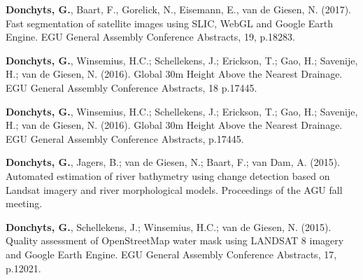 \begin{etaremune}{\small

\item \textbf{Donchyts, G.}, Baart, F., Gorelick, N., Eisemann, E., van de Giesen, N. (2017). Fast segmentation of satellite images using SLIC, WebGL and Google Earth Engine. EGU General Assembly Conference Abstracts, 19, p.18283.

\item \textbf{Donchyts, G.},  Winsemius, H.C.; Schellekens, J.; Erickson, T.; Gao, H.; Savenije, H.; van de Giesen, N. (2016). Global 30m Height Above the Nearest Drainage. EGU General Assembly Conference Abstracts, 18 p.17445.

\item \textbf{Donchyts, G.},  Winsemius, H.C.; Schellekens, J.; Erickson, T.; Gao, H.; Savenije, H.; van de Giesen, N. (2016). Global 30m Height Above the Nearest Drainage. EGU General Assembly Conference Abstracts, p.17445.

\item \textbf{Donchyts, G.},  Jagers, B.; van de Giesen, N.; Baart, F.; van Dam, A. (2015). Automated estimation of river bathymetry using change detection based on Landsat imagery and river morphological models. Proceedings of the AGU fall meeting.

\item \textbf{Donchyts, G.},  Schellekens, J.; Winsemius, H.C.; van de Giesen, N. (2015). Quality assessment of OpenStreetMap water mask using LANDSAT 8 imagery and Google Earth Engine. EGU General Assembly Conference Abstracts, 17, p.12021.

}\end{etaremune}



